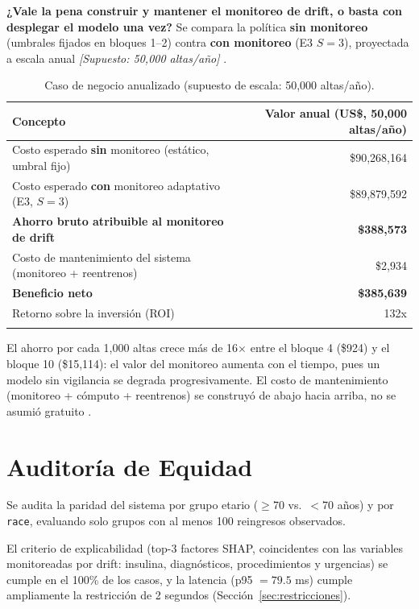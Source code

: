 \documentclass[11pt,a4paper]{article}
\newcommand{\supuesto}[1]{\textit{[Supuesto: #1]}}
\begin{document}
\textbf{¿Vale la pena construir y mantener el monitoreo de drift, o basta con desplegar el modelo una vez?} Se compara la política \textbf{sin monitoreo} (umbrales fijados en bloques 1--2) contra \textbf{con monitoreo} (E3 $S=3$), proyectada a escala anual \supuesto{50,000 altas/año} \cite{strack2014}.

{\small
\begin{longtable}{lr}
\toprule
Concepto & Valor anual (US\$, 50,000 altas/año) \\
\midrule
\endhead
Costo esperado \textbf{sin} monitoreo (estático, umbral fijo) & \$90,268,164 \\
Costo esperado \textbf{con} monitoreo adaptativo (E3, $S=3$) & \$89,879,592 \\
\textbf{Ahorro bruto atribuible al monitoreo de drift} & \textbf{\$388,573} \\
Costo de mantenimiento del sistema (monitoreo + reentrenos) & \$2,934 \\
\textbf{Beneficio neto} & \textbf{\$385,639} \\
Retorno sobre la inversión (ROI) & 132x \\
\bottomrule
\caption{Caso de negocio anualizado (supuesto de escala: 50,000 altas/año).}
\label{tab:caso-negocio}
\end{longtable}}

El ahorro por cada 1,000 altas crece más de 16$\times$ entre el bloque 4 (\$924) y el bloque 10 (\$15,114): el valor del monitoreo aumenta con el tiempo, pues un modelo sin vigilancia se degrada progresivamente. El costo de mantenimiento (monitoreo + cómputo + reentrenos) se construyó de abajo hacia arriba, no se asumió gratuito \cite{sculley2015}.

\section{Auditoría de Equidad}

Se audita la paridad del sistema por grupo etario ($\geq$70 vs.\ $<$70 años) y por \texttt{race}, evaluando solo grupos con al menos 100 reingresos observados.



El criterio de explicabilidad (top-3 factores SHAP, coincidentes con las variables monitoreadas por drift: insulina, diagnósticos, procedimientos y urgencias) se cumple en el 100\% de los casos, y la latencia (p95 $=79.5$ ms) cumple ampliamente la restricción de 2 segundos (Sección~\ref{sec:restricciones}).
\end{document}
